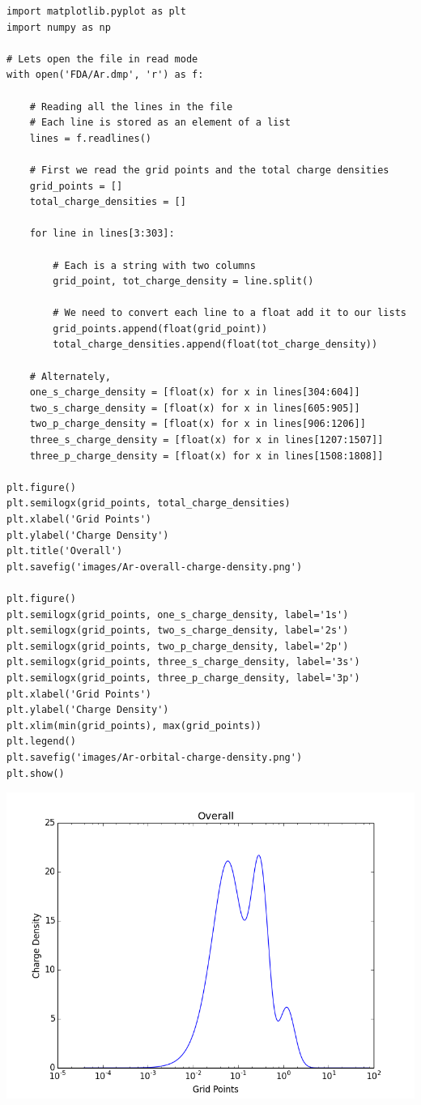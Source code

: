 \documentclass[11pt]{article}
\begin{document}
\begin{verbatim}
import matplotlib.pyplot as plt
import numpy as np

# Lets open the file in read mode
with open('FDA/Ar.dmp', 'r') as f:

    # Reading all the lines in the file
    # Each line is stored as an element of a list
    lines = f.readlines()

    # First we read the grid points and the total charge densities
    grid_points = []
    total_charge_densities = []

    for line in lines[3:303]:

        # Each is a string with two columns
        grid_point, tot_charge_density = line.split()

        # We need to convert each line to a float add it to our lists
        grid_points.append(float(grid_point))
        total_charge_densities.append(float(tot_charge_density))

    # Alternately,
    one_s_charge_density = [float(x) for x in lines[304:604]]
    two_s_charge_density = [float(x) for x in lines[605:905]]  
    two_p_charge_density = [float(x) for x in lines[906:1206]]
    three_s_charge_density = [float(x) for x in lines[1207:1507]]
    three_p_charge_density = [float(x) for x in lines[1508:1808]]
  
plt.figure()
plt.semilogx(grid_points, total_charge_densities)
plt.xlabel('Grid Points')
plt.ylabel('Charge Density')
plt.title('Overall')
plt.savefig('images/Ar-overall-charge-density.png')

plt.figure()
plt.semilogx(grid_points, one_s_charge_density, label='1s')
plt.semilogx(grid_points, two_s_charge_density, label='2s')
plt.semilogx(grid_points, two_p_charge_density, label='2p')
plt.semilogx(grid_points, three_s_charge_density, label='3s')
plt.semilogx(grid_points, three_p_charge_density, label='3p')
plt.xlabel('Grid Points')
plt.ylabel('Charge Density')
plt.xlim(min(grid_points), max(grid_points))
plt.legend()
plt.savefig('images/Ar-orbital-charge-density.png')
plt.show()
\end{verbatim}

\includegraphics[width=.9\linewidth]{./images/Ar-overall-charge-density.png}
\end{document}
